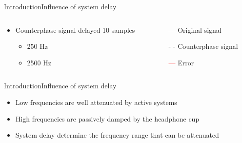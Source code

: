 \begin{frame}{Introduction}{Influence of system delay}
	\begin{columns}
		\begin{column}{0.5\textwidth}
			\begin{itemize}
				\item Counterphase signal delayed 10 samples	
				\begin{itemize}
					\item 250 Hz
					\item 2500 Hz 
				\end{itemize}	
			\end{itemize}
			\vspace{-6.5mm}			
		\begin{center}
	 		
	 	\end{center}
		\end{column}
		\begin{column}{0.5\textwidth} 
		\begin{itemize}
			\item[\textcolor{MATLABblue}{---}] Original signal
			\item[\textcolor{MATLABblue}{- -}] Counterphase signal
			\item[\textcolor{red}{---}] Error
		\end{itemize}
		\begin{center}
	 		
	 	\end{center}
		\end{column}
	\end{columns}
\end{frame}

\begin{frame}{Introduction}{Influence of system delay}
	\begin{center}
	\begin{itemize}
	\item Low frequencies are well attenuated by active systems
	\item High frequencies are passively damped by the headphone cup 
	\item System delay determine the frequency range that can be attenuated
	\end{itemize}
	\end{center}
\end{frame}



